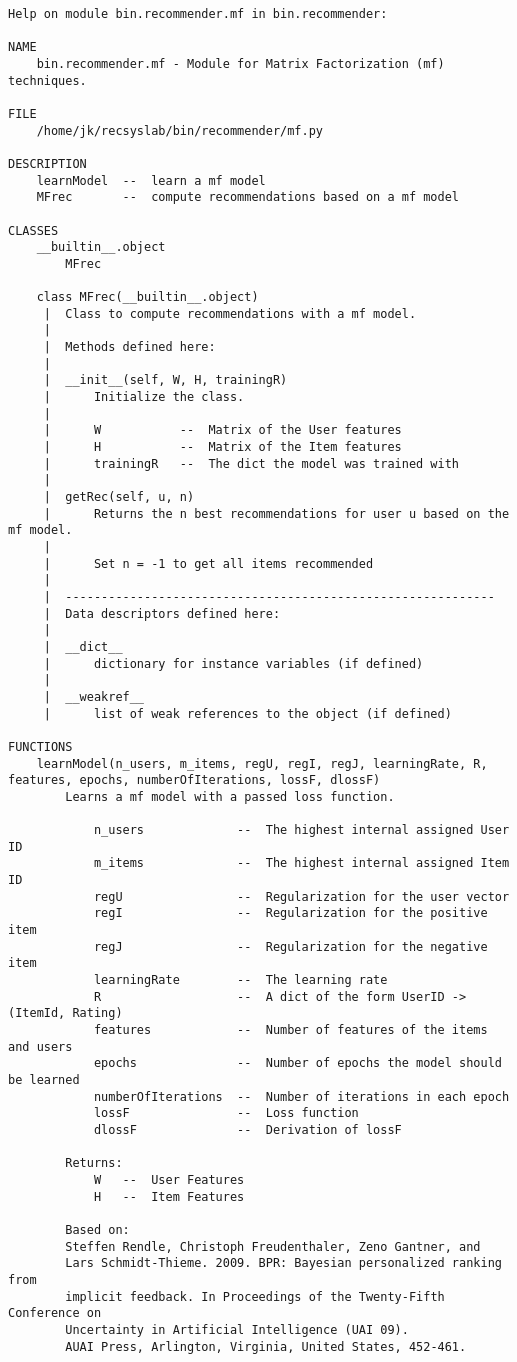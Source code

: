 \newpage
\begin{lstlisting}[style=docstring]
Help on module bin.recommender.mf in bin.recommender:

NAME
    bin.recommender.mf - Module for Matrix Factorization (mf) techniques.

FILE
    /home/jk/recsyslab/bin/recommender/mf.py

DESCRIPTION
    learnModel  --  learn a mf model
    MFrec       --  compute recommendations based on a mf model

CLASSES
    __builtin__.object
        MFrec
    
    class MFrec(__builtin__.object)
     |  Class to compute recommendations with a mf model.
     |  
     |  Methods defined here:
     |  
     |  __init__(self, W, H, trainingR)
     |      Initialize the class.
     |      
     |      W           --  Matrix of the User features
     |      H           --  Matrix of the Item features
     |      trainingR   --  The dict the model was trained with
     |  
     |  getRec(self, u, n)
     |      Returns the n best recommendations for user u based on the mf model.
     |      
     |      Set n = -1 to get all items recommended
     |  
     |  ------------------------------------------------------------
     |  Data descriptors defined here:
     |  
     |  __dict__
     |      dictionary for instance variables (if defined)
     |  
     |  __weakref__
     |      list of weak references to the object (if defined)

FUNCTIONS
    learnModel(n_users, m_items, regU, regI, regJ, learningRate, R, features, epochs, numberOfIterations, lossF, dlossF)
        Learns a mf model with a passed loss function.
        
            n_users             --  The highest internal assigned User ID
            m_items             --  The highest internal assigned Item ID
            regU                --  Regularization for the user vector
            regI                --  Regularization for the positive item
            regJ                --  Regularization for the negative item
            learningRate        --  The learning rate
            R                   --  A dict of the form UserID -> (ItemId, Rating)
            features            --  Number of features of the items and users
            epochs              --  Number of epochs the model should be learned
            numberOfIterations  --  Number of iterations in each epoch
            lossF               --  Loss function
            dlossF              --  Derivation of lossF
        
        Returns:
            W   --  User Features
            H   --  Item Features
        
        Based on:
        Steffen Rendle, Christoph Freudenthaler, Zeno Gantner, and
        Lars Schmidt-Thieme. 2009. BPR: Bayesian personalized ranking from
        implicit feedback. In Proceedings of the Twenty-Fifth Conference on
        Uncertainty in Artificial Intelligence (UAI 09).
        AUAI Press, Arlington, Virginia, United States, 452-461.
\end{lstlisting}

